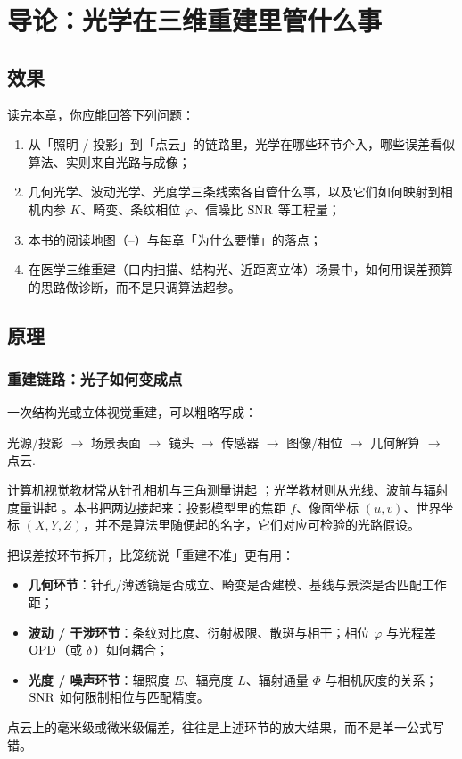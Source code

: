 \chapter{导论：光学在三维重建里管什么事}
\label{ch:00}

\section{效果}
\label{sec:ch00-effect}

读完本章，你应能回答下列问题：
\begin{enumerate}
  \item 从「照明 / 投影」到「点云」的链路里，光学在哪些环节介入，哪些误差看似算法、实则来自光路与成像；
  \item 几何光学、波动光学、光度学三条线索各自管什么事，以及它们如何映射到相机内参 $K$、畸变、条纹相位 $\varphi$、信噪比 $\mathrm{SNR}$ 等工程量；
  \item 本书的阅读地图（--）与每章「为什么要懂」的落点；
  \item 在医学三维重建（口内扫描、结构光、近距离立体）场景中，如何用误差预算的思路做诊断，而不是只调算法超参。
\end{enumerate}

\section{原理}
\label{sec:ch00-principle}

\subsection{重建链路：光子如何变成点}

一次结构光或立体视觉重建，可以粗略写成：
\begin{center}
光源/投影 $\to$ 场景表面 $\to$ 镜头 $\to$ 传感器 $\to$ 图像/相位 $\to$ 几何解算 $\to$ 点云.
\end{center}
计算机视觉教材常从针孔相机与三角测量讲起 \citep{HartleyZisserman2004}；光学教材则从光线、波前与辐射度量讲起 \citep{HechtOptics}。本书把两边接起来：投影模型里的焦距 $f$、像面坐标 $(u,v)$、世界坐标 $(X,Y,Z)$，并不是算法里随便起的名字，它们对应可检验的光路假设。

把误差按环节拆开，比笼统说「重建不准」更有用：
\begin{itemize}
  \item \textbf{几何环节}：针孔/薄透镜是否成立、畸变是否建模、基线与景深是否匹配工作距；
  \item \textbf{波动 / 干涉环节}：条纹对比度、衍射极限、散斑与相干；相位 $\varphi$ 与光程差 $\mathrm{OPD}$（或 $\delta$）如何耦合；
  \item \textbf{光度 / 噪声环节}：辐照度 $E$、辐亮度 $L$、辐射通量 $\Phi$ 与相机灰度的关系；$\mathrm{SNR}$ 如何限制相位与匹配精度。
\end{itemize}
点云上的毫米级或微米级偏差，往往是上述环节的放大结果，而不是单一公式写错。

